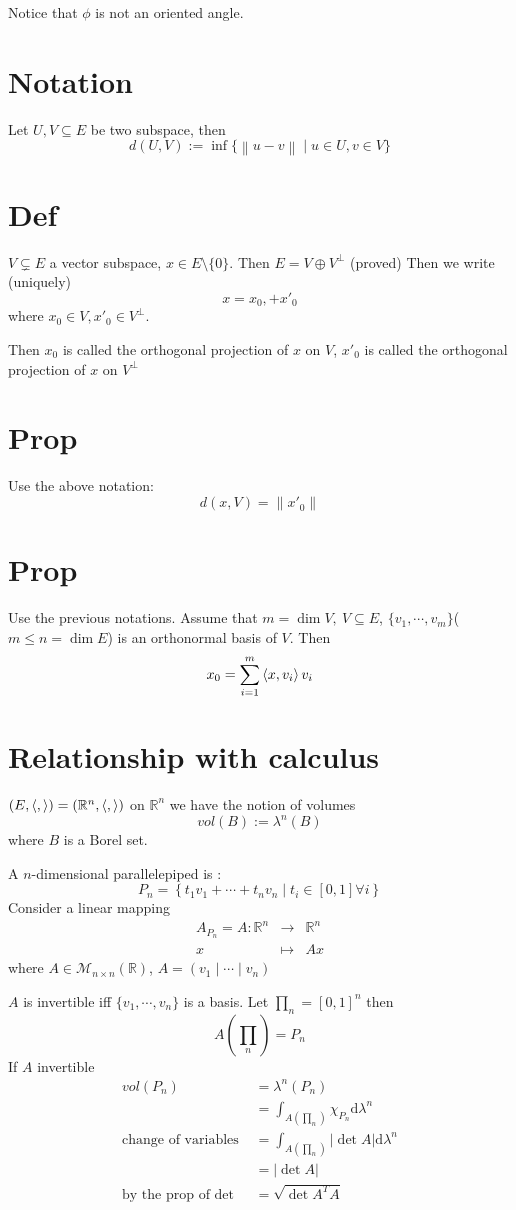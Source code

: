 \documentclass{book}
\newcommand{\abs}[1]{\left\lvert #1 \right\rvert}
\newcommand{\norm}[1]{\left\lVert #1 \right\rVert}
\begin{document}
Notice that $\phi$ is not an oriented angle.
\section{Notation}
Let $U,V\subseteq E$ be two subspace, then $$d(U,V):=\inf\{\norm{u-v}\mid u\in U,v\in V\}$$
\section{Def}
$V\subsetneq E$ a vector subspace, $x\in E\setminus\{0\}$. Then $E=V\oplus V^\perp$ (proved) Then we write (uniquely)
$$x=x_0,+x'_0$$ where $x_0\in V, x'_0\in V^\perp$.

Then $x_0$ is called the orthogonal projection of $x$ on $V$, $x'_0$ is called the orthogonal projection of $x$ on $V^\perp$
\section{Prop}
Use the above notation:
$$d(x,V)=\norm{x'_0}$$
\section{Prop}
Use the previous notations. Assume that $m=\dim V,\ V\subseteq E$, $\{v_1,\cdots,v_m\}$($m\leq n=\dim E$) is an orthonormal basis of $V$. Then
$$x_0=\sum\limits_{i=1}^m\left<x,v_i\right>v_i$$
\section{Relationship with calculus}
$(E,\left<,\right>)=(\mathbb{R}^n,\left<,\right>)$ on $\mathbb{R}^n$ we have the notion of volumes$$vol(B):=\lambda^n(B)$$
where $B$ is a Borel set.

A $n$-dimensional parallelepiped is :
$$P_n=\left\{t_1v_1+\cdots+t_nv_n\mid t_i\in[0,1]\forall i\right\}$$
Consider a linear mapping
$$\begin{aligned}
    A_{P_n}=A:\mathbb{R}^n&\rightarrow&\mathbb{R}^n\\x&\mapsto&Ax
\end{aligned}$$
where $A\in\mathcal{M}_{n\times n}(\mathbb{R})$, $A=(v_1\mid\cdots\mid v_n)$

$A$ is invertible iff $\{v_1,\cdots,v_n\}$ is a basis. Let $\prod_n=[0,1]^n$ then$$A(\prod_n)=P_n$$
If $A$ invertible
$$\begin{aligned}
    vol(P_n)&=\lambda^n(P_n)\\
    &=\int_{A(\prod_n)}\chi_{P_n}\text{d}\lambda^n\\
    \text{change of variables }&=\int_{A(\prod_n)}\abs{\det A}\text{d}\lambda^n\\
    &=\abs{\det A}\\
    \text{by the prop of det }&=\sqrt{\det A^TA}
\end{aligned}$$
\end{document}
